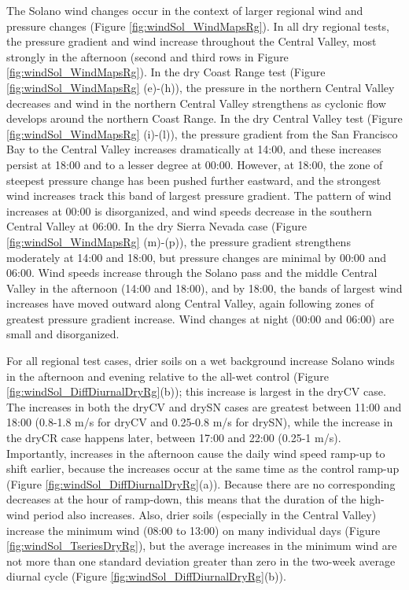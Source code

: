 The Solano wind changes occur in the context of larger regional wind and pressure changes (Figure \ref{fig:windSol_WindMapsRg}).  In all dry regional tests, the pressure gradient and wind increase throughout the Central Valley, most strongly in the afternoon (second and third rows in Figure \ref{fig:windSol_WindMapsRg}).  In the dry Coast Range test (Figure \ref{fig:windSol_WindMapsRg} (e)-(h)), the pressure in the northern Central Valley decreases and wind in the northern Central Valley strengthens as cyclonic flow develops around the northern Coast Range.  In the dry Central Valley test (Figure \ref{fig:windSol_WindMapsRg} (i)-(l)), the pressure gradient from the San Francisco Bay to the Central Valley increases dramatically at 14:00, and these increases persist at 18:00 and to a lesser degree at 00:00. However, at 18:00, the zone of steepest pressure change has been pushed further eastward, and the strongest wind increases track this band of largest pressure gradient.  The pattern of wind increases at 00:00 is disorganized, and wind speeds decrease in the southern Central Valley at 06:00.  In the dry Sierra Nevada case (Figure \ref{fig:windSol_WindMapsRg} (m)-(p)), the pressure gradient strengthens moderately at 14:00 and 18:00, but pressure changes are minimal by 00:00 and 06:00.  Wind speeds increase through the Solano pass and the middle Central Valley in the afternoon (14:00 and 18:00), and by 18:00, the bands of largest wind increases have moved outward along Central Valley, again following zones of greatest pressure gradient increase.  Wind changes at night (00:00 and 06:00) are small and disorganized.


For all regional test cases, drier soils on a wet background increase Solano winds in the afternoon and evening relative to the all-wet control (Figure \ref{fig:windSol_DiffDiurnalDryRg}(b)); this increase is largest in the dryCV case.  The increases in both the dryCV and drySN cases are greatest between 11:00 and 18:00 (0.8-1.8 m/s for dryCV and 0.25-0.8 m/s for drySN), while the increase in the dryCR case happens later, between 17:00 and 22:00 (0.25-1 m/s).  Importantly, increases in the afternoon cause the daily wind speed ramp-up to shift earlier, because the increases occur at the same time as the control ramp-up (Figure \ref{fig:windSol_DiffDiurnalDryRg}(a)).  Because there are no corresponding decreases at the hour of ramp-down, this means that the duration of the high-wind period also increases.  Also, drier soils (especially in the Central Valley) increase the minimum wind (08:00 to 13:00) on many individual days (Figure \ref{fig:windSol_TseriesDryRg}), but the average increases in the minimum wind are not more than one standard deviation greater than zero in the two-week average diurnal cycle (Figure \ref{fig:windSol_DiffDiurnalDryRg}(b)).

